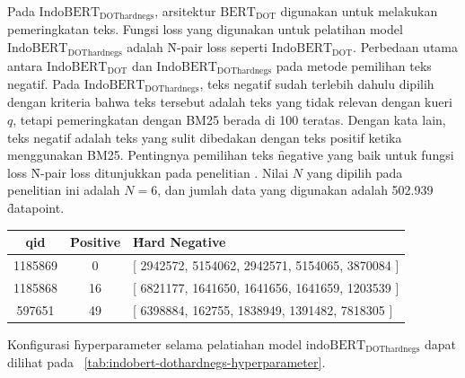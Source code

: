 Pada $\text{IndoBERT}_\text{DOThardnegs}$, arsitektur $\text{BERT}_\text{DOT}$ digunakan untuk melakukan pemeringkatan teks. Fungsi loss yang digunakan untuk pelatihan model $\text{IndoBERT}_{\text{DOThardnegs}}$ adalah \f{N-pair loss} seperti $\text{IndoBERT}_{\text{DOT}}$. Perbedaan utama antara $\text{IndoBERT}_{\text{DOT}}$ dan $\text{IndoBERT}_{\text{DOThardnegs}}$ pada metode pemilihan teks negatif. Pada $\text{IndoBERT}_{\text{DOThardnegs}}$, teks negatif sudah terlebih dahulu dipilih dengan kriteria bahwa teks tersebut adalah teks yang tidak relevan dengan kueri $q$, tetapi pemeringkatan dengan BM25 berada di 100 teratas. Dengan kata lain, teks negatif adalah teks yang sulit dibedakan dengan teks positif ketika menggunakan BM25. Pentingnya pemilihan teks \f{negative} yang baik untuk fungsi loss \f{N-pair loss} ditunjukkan pada penelitian \cite{ANCE,RocketQA}. Nilai $N$ yang dipilih pada penelitian ini adalah $N=6$, dan jumlah data yang digunakan adalah 502.939 \f{datapoint}.

\begin{table}
    \centering
    \label{tab:hardnegsbm25}
    \begin{tabular}{|c|c|p{8cm}|}
        \hline
        qid & \f{Positive} & \f{Hard Negative}                                           \\
        \hline
        1185869 &  0  & [ 2942572, 5154062, 2942571, 5154065, 3870084 ] \\
        \hline
        1185868 &  16  & [ 6821177, 1641650, 1641656, 1641659, 1203539 ] \\
        \hline
        597651 &  49  & [ 6398884, 162755, 1838949, 1391482, 7818305 ] \\
        \hline
    \end{tabular}
\end{table}


Konfigurasi \f{hyperparameter} selama pelatiahan model $\text{indoBERT}_{\text{DOThardnegs}}$ dapat  dilihat pada \tab~\ref{tab:indobert-dothardnegs-hyperparameter}.

